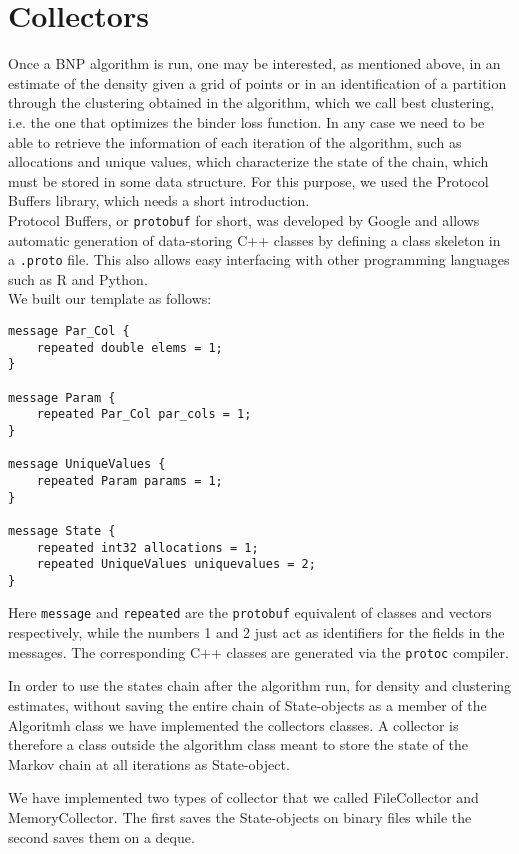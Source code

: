 \section{Collectors}

Once a BNP algorithm is run, one may be interested, as mentioned above, in an estimate of the density given a grid of points or in an identification of a partition through the clustering obtained in the algorithm, which we call best clustering, i.e. the one that optimizes the binder loss function. In any case we need to be able to retrieve the information of each iteration of the algorithm, such as allocations and unique values, which characterize the state of the chain, which must be stored in some data structure.
For this purpose, we used the Protocol Buffers library, which needs a short introduction. \\
Protocol Buffers, or \verb|protobuf| for short, was developed by Google and allows automatic generation of data-storing C++ classes by defining a class skeleton in a \verb|.proto| file.
This also allows easy interfacing with other programming languages such as R and Python. \\
We built our template as follows:
\begin{verbatim}
message Par_Col {
    repeated double elems = 1;
}

message Param {
    repeated Par_Col par_cols = 1;
}

message UniqueValues {
    repeated Param params = 1;
}

message State {
    repeated int32 allocations = 1;
    repeated UniqueValues uniquevalues = 2;
}
\end{verbatim}
Here \verb|message| and \verb|repeated| are the \verb|protobuf| equivalent of classes and vectors respectively, while the numbers 1 and 2 just act as identifiers for the fields in the messages.
The corresponding C++ classes are generated via the \verb|protoc| compiler.


In order to use the states chain after the algorithm run, for density and clustering estimates, without saving the entire chain of State-objects as a member of the Algoritmh class we have implemented the collectors classes. 
A collector is therefore a class outside the algorithm class meant to store the state of the Markov chain at all iterations as State-object.


We have implemented two types of collector that we called FileCollector and MemoryCollector.
The first saves the State-objects on binary files while the second saves them on a deque.

